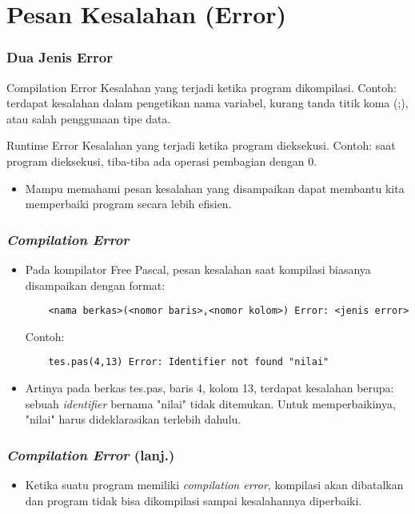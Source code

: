 \section{Pesan Kesalahan (Error)}
\frame{\sectionpage}

\begin{frame}
\frametitle{Dua Jenis Error}
\begin{block}{Compilation Error}
  Kesalahan yang terjadi ketika program dikompilasi.\newline
  Contoh: terdapat kesalahan dalam pengetikan nama variabel, kurang tanda titik koma (;), atau salah penggunaan tipe data.
\end{block}
\begin{block}{Runtime Error}
  Kesalahan yang terjadi ketika program dieksekusi.\newline
  Contoh: saat program dieksekusi, tiba-tiba ada operasi pembagian dengan 0.
\end{block}

\begin{itemize}
  \item Mampu memahami pesan kesalahan yang disampaikan dapat membantu kita memperbaiki program secara lebih efisien.
\end{itemize}
\end{frame}

\begin{frame}[fragile]
\frametitle{\textit{Compilation Error}}
\begin{itemize}
  \item Pada kompilator Free Pascal, pesan kesalahan saat kompilasi biasanya disampaikan dengan format:
  \begin{lstlisting}
    <nama berkas>(<nomor baris>,<nomor kolom>) Error: <jenis error>
  \end{lstlisting}
  Contoh:
  \begin{lstlisting}
    tes.pas(4,13) Error: Identifier not found "nilai"
  \end{lstlisting}
  \item Artinya pada berkas tes.pas, baris 4, kolom 13, terdapat kesalahan berupa: sebuah \textit{identifier} bernama "nilai" tidak ditemukan. Untuk memperbaikinya, "nilai" harus dideklarasikan terlebih dahulu.
\end{itemize}
\end{frame}

\begin{frame}[fragile]
\frametitle{\textit{Compilation Error} (lanj.)}
\begin{itemize}
  \item Ketika suatu program memiliki \textit{compilation error}, kompilasi akan dibatalkan dan program tidak bisa dikompilasi sampai kesalahannya diperbaiki.
\end{itemize}
\end{frame}

